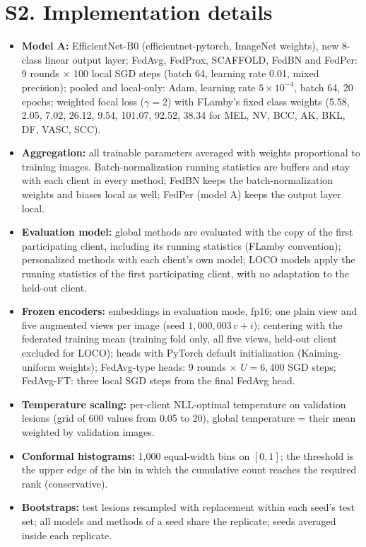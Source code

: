 \documentclass[10pt]{article}
\begin{document}
\section*{S2. Implementation details}
\begin{itemize}
\item \textbf{Model A:} EfficientNet-B0 (efficientnet-pytorch, ImageNet weights), new 8-class linear output layer;
FedAvg, FedProx, SCAFFOLD, FedBN and FedPer: 9 rounds $\times$ 100 local SGD steps (batch 64, learning rate 0.01, mixed
precision); pooled and local-only: Adam, learning rate $5\times10^{-4}$, batch 64, 20 epochs; weighted focal loss
($\gamma=2$) with FLamby's fixed class weights (5.58, 2.05, 7.02, 26.12, 9.54, 101.07, 92.52, 38.34 for MEL, NV, BCC, AK,
BKL, DF, VASC, SCC).
\item \textbf{Aggregation:} all trainable parameters averaged with weights proportional to training images.
Batch-normalization running statistics are buffers and stay with each client in every method; FedBN keeps the
batch-normalization weights and biases local as well; FedPer (model A) keeps the output layer local.
\item \textbf{Evaluation model:} global methods are evaluated with the copy of the first participating client,
including its running statistics (FLamby convention); personalized methods with each client's own model; LOCO
models apply the running statistics of the first participating client, with no adaptation to the held-out client.
\item \textbf{Frozen encoders:} embeddings in evaluation mode, fp16; one plain view and five augmented views per image
(seed $1{,}000{,}003\,v+i$); centering with the federated training mean (training fold only, all five views,
held-out client excluded for LOCO); heads with PyTorch default initialization (Kaiming-uniform weights); FedAvg-type
heads: 9 rounds $\times$ $U=6{,}400$ SGD steps; FedAvg-FT: three local SGD steps from the final FedAvg head.
\item \textbf{Temperature scaling:} per-client NLL-optimal temperature on validation lesions (grid of 600 values from
0.05 to 20), global temperature = their mean weighted by validation images.
\item \textbf{Conformal histograms:} 1,000 equal-width bins on $[0,1]$; the threshold is the upper edge of the bin in
which the cumulative count reaches the required rank (conservative).
\item \textbf{Bootstraps:} test lesions resampled with replacement within each seed's test set; all models and methods
of a seed share the replicate; seeds averaged inside each replicate.
\end{itemize}
\end{document}
